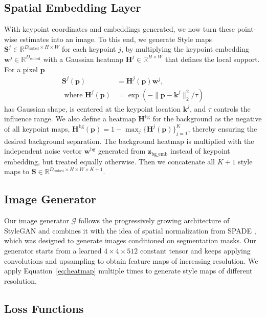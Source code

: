 \documentclass[10pt, conference, compsocconf]{IEEEtran}
\newcommand{\myR}{\mathbb{R}}
\newcommand{\vk}{\mathbf{k}}
\newcommand{\vp}{\mathbf{p}}
\newcommand{\vw}{\mathbf{w}}
\newcommand{\vz}{\mathbf{z}}
\newcommand{\mH}{\mathbf{H}}
\newcommand{\mS}{\mathbf{S}}
\newcommand{\cG}{\mathcal G}
\begin{document}
\subsection{Spatial Embedding Layer}
\label{sec: embedding layer}
With keypoint coordinates and embeddings generated, we now turn these point-wise estimates into an image. 
To this end, we generate Style maps $\mS^j\in\myR^{D_\text{embed}\times H\times W}$ for each keypoint $j$,
by multiplying the keypoint embedding $\vw^j\in\myR^{D_\text{embed}}$ with a Gaussian heatmap $\mH^j\in\myR^{H\times W}$ that defines the local support. For a pixel $\vp$
\begin{equation}
    \begin{aligned}
       \mS^j(\vp)&=\mH^j(\vp)\vw^j, \\
       \text{ where }  \mH^j(\vp)&=\exp\left(-\|\vp-\vk^j\|_2^2/\tau \right)
     \end{aligned}
\label{eq:heatmap}
\end{equation}
has Gaussian shape, is centered at the keypoint location $\vk^j$, and $\tau$ controls the influence range. We also define a heatmap $\mH^\text{bg}$ for the background as the negative of all keypoint maps, $\mH^\text{bg}(\vp)=1-\max_j\{\mH^j(\vp)\}_{j=1}^K$, thereby ensuring the desired background separation. The background heatmap is multiplied with the independent noise vector $\vw^\text{bg}$ generated from $\vz_\text{bg\_emb}$ instead of keypoint embedding, but treated equally otherwise.
Then we concatenate all $K+1$ style maps 
to $\mS\in\myR^{ D_\text{embed}\times H\times W \times K+1}$. 


\subsection{Image Generator} \label{sec:image_generator}

Our image generator $\cG$ follows the progressively growing architecture of StyleGAN \cite{karras2019style} and combines it with the idea of spatial normalization from SPADE \cite{park2019semantic}, which was designed to generate images conditioned on segmentation masks. 
Our generator starts from a learned $4\times4\times512$ constant tensor and keeps applying convolutions and upsampling to obtain feature maps of increasing resolution. 
We apply Equation~\ref{eq:heatmap} multiple times to generate style maps of different resolution.




\subsection{Loss Functions}
\end{document}
